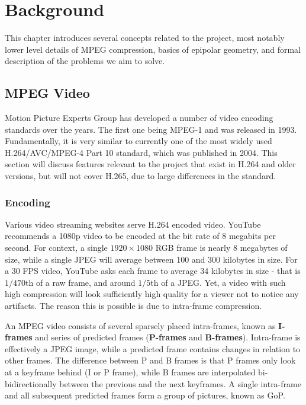 \documentclass[11pt,english]{report}
\begin{document}
\chapter{Background}

This chapter introduces several concepts related to the project, most notably lower level details of MPEG compression, basics of epipolar geometry, and formal description of the problems we aim to solve.

\section{MPEG Video}

Motion Picture Experts Group has developed a number of video encoding standards over the years. The first one being MPEG-1 and was released in 1993. Fundamentally, it is very similar to currently one of the most widely used H.264/AVC/MPEG-4 Part 10 standard, which was published in 2004. This section will discuss features relevant to the project that exist in H.264 and older versions, but will not cover H.265, due to large differences in the standard.

\subsection{Encoding}

Various video streaming websites serve H.264 encoded video. YouTube recommends a 1080p video to be encoded at the bit rate of 8 megabits per second\cite{youtube}. For context, a single $1920 \times 1080$ RGB frame is nearly 8 megabytes of size, while a single JPEG will average between 100 and 300 kilobytes in size. For a 30 FPS video, YouTube asks each frame to average 34 kilobytes in size - that is $1/470$th of a raw frame, and around $1/5$th of a JPEG. Yet, a video with such high compression will look sufficiently high quality for a viewer not to notice any artifacts. The reason this is possible is due to intra-frame compression.

An MPEG video consists of several sparsely placed intra-frames, known as \textbf{I-frames} and series of predicted frames (\textbf{P-frames} and \textbf{B-frames}). Intra-frame is effectively a JPEG image, while a predicted frame contains changes in relation to other frames. The difference between P and B frames is that P frames only look at a keyframe behind (I or P frame), while B frames are interpolated bi-bidirectionally between the previous and the next keyframes. A single intra-frame and all subsequent predicted frames form a group of pictures, known as GoP.
\end{document}
